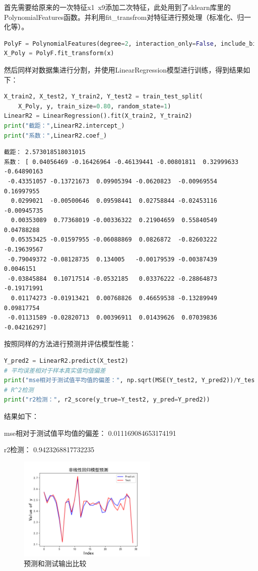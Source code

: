\documentclass{source/Experiment}
\begin{document}
            首先需要给原来的一次特征x1~x9添加二次特征，此处用到了sklearn库里的PolynomialFeatures函数。并利用fit\_transfrom对特征进行预处理（标准化、归一化等）。
            \begin{lstlisting}[language=Python]
PolyF = PolynomialFeatures(degree=2, interaction_only=False, include_bias=False)
X_Poly = PolyF.fit_transform(x)
            \end{lstlisting}
            然后同样对数据集进行分割，并使用LinearRegression模型进行训练，得到结果如下：
            \begin{lstlisting}[language=Python]
X_train2, X_test2, Y_train2, Y_test2 = train_test_split(
    X_Poly, y, train_size=0.80, random_state=1)
LinearR2 = LinearRegression().fit(X_train2, Y_train2)
print("截距：",LinearR2.intercept_)
print("系数：",LinearR2.coef_)
            \end{lstlisting}
            \begin{lstlisting}
截距： 2.573018518031015
系数： [ 0.04056469 -0.16426964 -0.46139441 -0.00801811  0.32999633 -0.64890163
 -0.43351057 -0.13721673  0.09905394 -0.0620823  -0.00969554  0.16997955
  0.0299021  -0.00500646  0.09598441  0.02758844 -0.02453116 -0.00945735
  0.00353089  0.77368019 -0.00336322  0.21904659  0.55840549  0.04788288
  0.05353425 -0.01597955 -0.06088869  0.0826872  -0.82603222 -0.19639567
 -0.79049372 -0.08128735  0.134005   -0.00179539 -0.00387439  0.0046151
 -0.03845884  0.10717514 -0.0532185   0.03376222 -0.28864873 -0.19171991
  0.01174273 -0.01913421  0.00768826  0.46659538 -0.13289949  0.09817754
 -0.01131589 -0.02820713  0.00396911  0.01439626  0.07039836 -0.04216297]
\end{lstlisting}
            按照同样的方法进行预测并评估模型性能：
            \begin{lstlisting}[language=Python]
Y_pred2 = LinearR2.predict(X_test2)
# 平均误差相对于样本真实值均值偏差
print("mse相对于测试值平均值的偏差：", np.sqrt(MSE(Y_test2, Y_pred2))/Y_test2.mean())
# R^2检测
print("r2检测：", r2_score(y_true=Y_test2, y_pred=Y_pred2))
            \end{lstlisting}
            结果如下：

            mse相对于测试值平均值的偏差： 0.011169084653174191

            r2检测： 0.9423268817732235

            \begin{figure}[H]
                \centering
                \includegraphics[width = 0.6\textwidth]{LinearR2}
                \caption{预测和测试输出比较}
            \end{figure}
\end{document}
